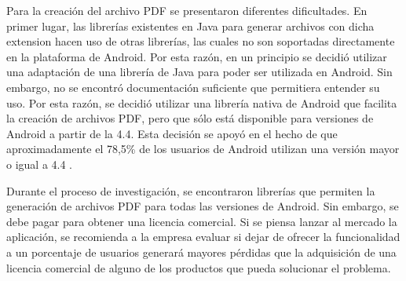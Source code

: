 Para la creación del archivo PDF se presentaron diferentes dificultades. En primer lugar, las librerías existentes en Java para generar archivos con dicha extension hacen uso de otras librerías, las cuales no son soportadas directamente en la plataforma de Android. Por esta razón, en un principio se decidió utilizar una adaptación de una librería de Java para poder ser utilizada en Android. Sin embargo, no se encontró documentación suficiente que permitiera entender su uso. Por esta razón, se decidió utilizar una librería nativa de Android que facilita la creación de archivos PDF, pero que sólo está disponible para versiones de Android a partir de la 4.4. Esta decisión se apoyó en el hecho de que aproximadamente el 78,5\% de los usuarios de Android utilizan una versión mayor o igual a 4.4 \cite{USG1}. 


Durante el proceso de investigación, se encontraron librerías que permiten la generación de archivos PDF para todas las versiones de Android. Sin embargo, se debe pagar para obtener una licencia comercial. Si se piensa lanzar al mercado la aplicación, se recomienda a la empresa evaluar si dejar de ofrecer la funcionalidad a un porcentaje de usuarios generará mayores pérdidas que la adquisición de una licencia comercial de alguno de los productos que pueda solucionar el problema.

